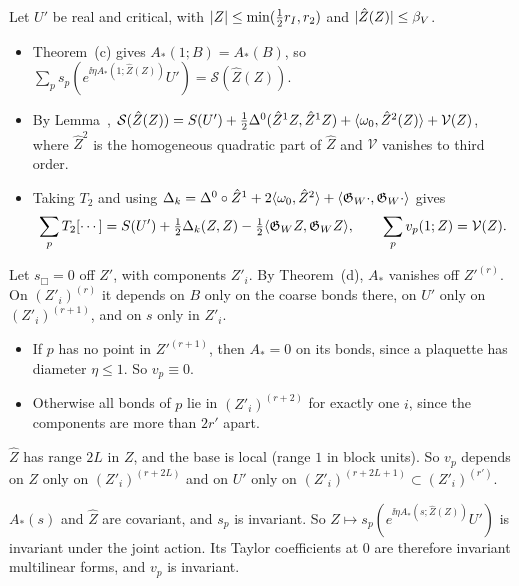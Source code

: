 \begin{detail}
\begin{step}[(c): identification]
Let $U'$ be real and critical, with $\lvert Z\rvert\le\min(\frac12r_I,r_2)$ and $\lvert\hat Z(Z)\rvert\le\beta_V$.
\begin{itemize}
\item Theorem~(c) gives $A_*(1;B)=A_*(B)$, so $\sum_ps_p(e^{\ii\eta A_*(1;\hat Z(Z))}U')=\mathcal S(\hat Z(Z))$.
\item By Lemma~, $\mathcal S(\hat Z(Z))=S(U')+\frac12\Delta^0(\hat Z^1Z,\hat Z^1Z)+\langle \omega_0,\hat Z^2(Z)\rangle+\mathcal V(Z)$, where $\hat Z^2$ is the homogeneous quadratic part of $\hat Z$ and $\mathcal V$ vanishes to third order.
\item Taking $T_2$ and using $\Delta_k=\Delta^0\circ\hat Z^1+2\langle \omega_0,\hat Z^2\rangle+\langle \mathfrak G_W\cdot,\mathfrak G_W\cdot\rangle$ gives
\[
\sum_pT_2[\cdots]=S(U')+\tfrac12\Delta_k(Z,Z)-\tfrac12\langle \mathfrak G_WZ,\mathfrak G_WZ\rangle,\qquad\sum_pv_p(1;Z)=\mathcal V(Z).
\]
\end{itemize}
\end{step}

\begin{step}[(d): factorization]
Let $s_\Box=0$ off $Z'$, with components $Z'_i$. By Theorem~(d), $A_*$ vanishes off $Z'^{(r)}$. On $(Z'_i)^{(r)}$ it depends on $B$ only on the coarse bonds there, on $U'$ only on $(Z'_i)^{(r+1)}$, and on $s$ only in $Z'_i$.
\begin{itemize}
\item If $p$ has no point in $Z'^{(r+1)}$, then $A_*=0$ on its bonds, since a plaquette has diameter $\eta\le1$. So $v_p\equiv0$.
\item Otherwise all bonds of $p$ lie in $(Z'_i)^{(r+2)}$ for exactly one $i$, since the components are more than $2r'$ apart.
\end{itemize}
$\hat Z$ has range $2L$ in $Z$, and the base is local (range $1$ in block units). So $v_p$ depends on $Z$ only on $(Z'_i)^{(r+2L)}$ and on $U'$ only on $(Z'_i)^{(r+2L+1)}\subset(Z'_i)^{(r')}$.
\end{step}

\begin{step}[(e): invariance]
$A_*(s)$ and $\hat Z$ are covariant, and $s_p$ is invariant. So $Z\mapsto s_p(e^{\ii\eta A_*(s;\hat Z(Z))}U')$ is invariant under the joint action. Its Taylor coefficients at $0$ are therefore invariant multilinear forms, and $v_p$ is invariant.
\end{step}
\end{detail}

